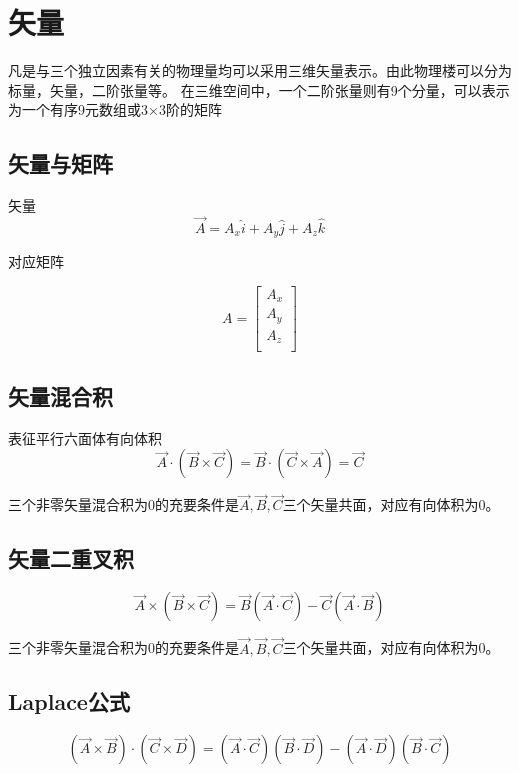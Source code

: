 \chapter{矢量}

凡是与三个独立因素有关的物理量均可以采用三维矢量表示。由此物理楼可以分为标量，矢量，二阶张量等。
在三维空间中，一个二阶张量则有9个分量，可以表示为一个有序9元数组或3×3阶的矩阵
\section{矢量与矩阵}


矢量
\[\overrightarrow{A}=A_x\widehat{i}+A_y\widehat{j}+A_z\widehat{k}\]

对应矩阵

\[A=\left[ \begin{array}{c}
A_x\\
A_y\\
A_z\\
\end{array} \right] \]

\section{矢量混合积}
表征平行六面体有向体积
\[
\vec{A}\cdot \left( \vec{B}\times \vec{C} \right) =\vec{B}\cdot \left( \vec{C}\times \vec{A} \right) =\vec{C}
\]

\begin{newdef}[]
	三个非零矢量混合积为0的充要条件是$\vec{A},\vec{B},\vec{C}$三个矢量共面，对应有向体积为0。
\end{newdef}




\section{矢量二重叉积}	
\[
\vec{A}\times \left( \vec{B}\times \vec{C} \right) =\vec{B}\left( \vec{A}\cdot \vec{C} \right) -\vec{C}\left( \vec{A}\cdot \vec{B} \right) 
\]
\begin{newdef}[]
	三个非零矢量混合积为0的充要条件是$\vec{A},\vec{B},\vec{C}$三个矢量共面，对应有向体积为0。
\end{newdef}



\section{Laplace公式}
\[
\left( \vec{A}\times \vec{B} \right) \cdot \left( \vec{C}\times \vec{D} \right) =\left( \vec{A}\cdot \vec{C} \right) \left( \vec{B}\cdot \vec{D} \right) -\left( \vec{A}\cdot \vec{D} \right) \left( \vec{B}\cdot \vec{C} \right) 
\]

